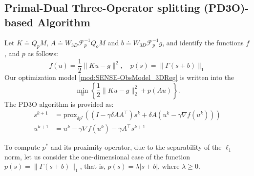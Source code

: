 \documentclass[preprint]{elsarticle}
\renewcommand{\ge}{\geqslant}
\renewcommand{\ge}{\geqslant}
\begin{document}
\subsection{Primal-Dual Three-Operator splitting (PD3O)-based Algorithm }

Let $K\doteq Q_{p}M$, $A\doteq W_{3D}\mathcal{F}_p^{-1}Q_{o}M$ and $b \doteq W_{3D}\mathcal{F}_p^{-1} g$,
and identify the functions $f$, and $p$ as follows:
\begin{equation}\label{identify3function:1}
f(u)=\frac{1}{2}\|Ku-g\|^2, \quad p(s)=\| \Gamma (s+b)\| _{1}
\end{equation}
Our optimization model \eqref{mod:SENSE-ObsModel_3DReg} is written into
the $$ \min_{u}\left\{ \frac{1}{2}\| Ku-g \|_{2}^{2}+ p(Au)\right\}. $$
The  PD3O algorithm is provided as:
\begin{subequations}
    \begin{align*}
    s^{k+1}&=\mathrm{prox}_{\delta p^*}\left((I-\gamma\delta AA^\top)s^k+\delta A(u^k-\gamma \nabla f(u^k))\right)\\
    u^{k+1}&=u^k-\gamma \nabla f(u^k)-\gamma A^\top s^{k+1}
    \end{align*}
\end{subequations}



To compute $p^*$ and its proximity operator, due to the separability of the $\ell_1$ norm, let us consider the one-dimensional case of the function $p(s)=\| \Gamma (s+b)\| _{1}$, that is, $p(s)=\lambda|s+b|$, where $\lambda \ge 0$.
\end{document}
